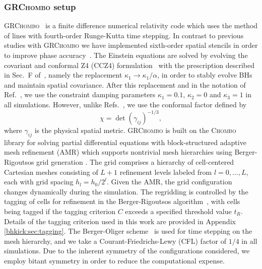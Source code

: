 \subsubsection{\textsc{GRChombo} setup}
\label{bhkick:sec:grchombo}
\textsc{GRChombo}~\cite{Clough:2015sqa} is a finite difference
numerical relativity code which uses the method of lines with
fourth-order Runge-Kutta time stepping. In contrast to previous studies
with \textsc{GRChombo} we have implemented sixth-order spatial
stencils in order to improve phase accuracy~\cite{Husa:2007hp}. The
Einstein equations are solved by evolving the covariant and conformal
Z4 (CCZ4) formulation~\cite{Alic:2011gg} with the prescription
described in Sec.~F of~\cite{Alic:2013xsa}, namely the replacement
$\kappa_1 \to \kappa_1/\alpha$, in order to stably evolve BHs
and maintain spatial covariance. After this replacement and in the
notation of Ref.~\cite{Alic:2011gg}, we use the constraint damping
parameters $\kappa_1=0.1$, $\kappa_2=0$ and $\kappa_3=1$ in all
simulations.  However, unlike Refs.~\cite{Clough:2015sqa,Alic:2011gg},
we use the conformal factor defined by
\begin{equation}
    \chi = \det(\gamma_{ij})^{-1/3},\label{bhkick:eq:con-fac}
\end{equation}
where $\gamma_{ij}$ is the physical spatial metric.
\textsc{GRChombo} is built on the \textsc{Chombo}~\cite{ChomboReport} 
library for solving partial differential equations with 
block-structured adaptive mesh refinement (AMR) which supports
nontrivial mesh hierarchies using Berger-Rigoutsos grid generation
\cite{Berger1991}. The grid comprises a hierarchy of cell-centered 
Cartesian meshes consisting of $L+1$ refinement levels labeled from 
$l=0,\ldots,L$, each with grid spacing $h_l=h_0/2^l$. Given the 
AMR, the grid configuration changes dynamically during the simulation.
The regridding is controlled by the tagging of cells for refinement 
in the Berger-Rigoutsos algorithm~\cite{Berger1991}, with cells being 
tagged if the tagging criterion $C$ exceeds a specified threshold 
value $t_R$. Details of the tagging criterion used in this work are 
provided in Appendix \ref{bhkick:sec:tagging}. The Berger-Oliger scheme~\cite{Berger1991} 
is used for time stepping on the mesh hierarchy, and we take a 
Courant-Friedrichs-Lewy (CFL) factor of $1/4$ in all simulations. 
Due to the inherent symmetry of the configurations considered, we 
employ bitant symmetry in order to reduce the computational expense.

